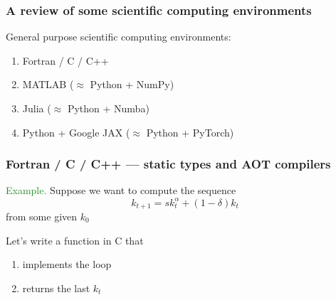 \documentclass[
    xcolor={svgnames,dvipsnames},
    hyperref={colorlinks, citecolor=DeepPink4, linkcolor=DarkRed, urlcolor=DarkBlue}
    ]{beamer}  %
\newcommand{\Eg}{\textcolor{ForestGreen}{Example. }}
\newcommand{\1}{\mathbbm 1}
\begin{document}
\begin{frame}
    \frametitle{A review of some scientific computing environments}


    General purpose scientific computing environments:

        \vspace{0.5em}
        \vspace{0.5em}
    \begin{enumerate}
        \item Fortran / C / C++
        \vspace{0.5em}
        \vspace{0.5em}
        \item MATLAB ($\approx$ Python + NumPy)
        \vspace{0.5em}
        \vspace{0.5em}
        \item Julia ($\approx$ Python + Numba) 
        \vspace{0.5em}
        \vspace{0.5em}
        \item Python + Google JAX ($\approx$ Python + PyTorch)
    \end{enumerate}

\end{frame}



\begin{frame}
    \frametitle{Fortran / C / C++ --- static types and AOT compilers}


    \Eg Suppose we want to compute the sequence
    \begin{equation*}
        k_{t+1} = s k_t^\alpha + (1 - \delta) k_t
    \end{equation*}
    from some given $k_0$ 

        \vspace{0.5em}
        \vspace{0.5em}
        \vspace{0.5em}

    Let's write a function in C that 
    \begin{enumerate}
        \item implements the loop 
        \vspace{0.5em}
        \item returns the last $k_t$
    \end{enumerate}


\end{frame}
\end{document}
